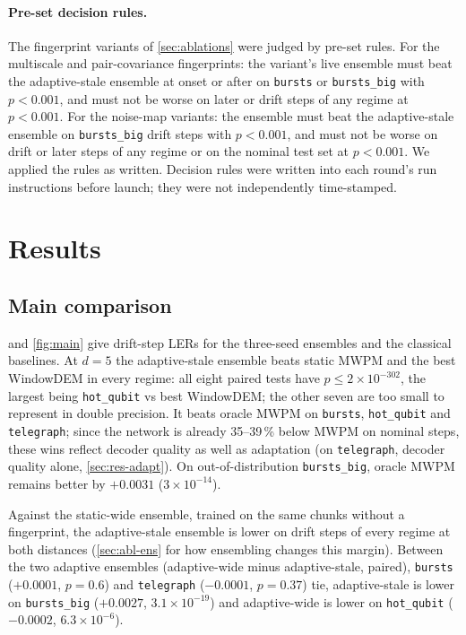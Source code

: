 \documentclass[11pt,a4paper]{article}
\newcommand{\reg}[1]{\texttt{#1}}
\newcommand{\E}[2]{${#1}{\times}10^{-#2}$}  %
\newcommand{\Eb}[2]{{#1}{\times}10^{-#2}}   %
\begin{document}
\paragraph{Pre-set decision rules.}
The fingerprint variants of \cref{sec:ablations} were judged by pre-set rules. For the multiscale
and pair-covariance fingerprints: the variant's live ensemble must beat the adaptive-stale ensemble at onset or
after on \reg{bursts} or \reg{bursts\_big} with $p<0.001$, and must not be worse on later or drift steps of any regime
at $p<0.001$. For the noise-map variants: the ensemble must beat the adaptive-stale ensemble on \reg{bursts\_big}
drift steps with $p<0.001$, and must not be worse on drift or later steps of any regime or on the nominal test set at
$p<0.001$. We applied the rules as written. Decision rules were written into each round's run instructions before
launch; they were not independently time-stamped.

\section{Results}\label{sec:results}

\subsection{Main comparison}\label{sec:res-main}
 and \cref{fig:main} give drift-step LERs for the three-seed ensembles and the classical baselines.
At $d=5$ the adaptive-stale ensemble beats static MWPM and the best WindowDEM in every regime: all eight
paired tests have $p\le\Eb{2}{302}$, the largest being \reg{hot\_qubit} vs best WindowDEM; the other seven are too
small to represent in double precision. It beats oracle MWPM on \reg{bursts},
\reg{hot\_qubit} and \reg{telegraph}; since the network is already 35--39\,\% below MWPM on nominal steps, these wins
reflect decoder quality as well as adaptation (on \reg{telegraph}, decoder quality alone, \cref{sec:res-adapt}). On
out-of-distribution \reg{bursts\_big}, oracle MWPM remains better by $+0.0031$ (\E{3}{14}).

Against the static-wide ensemble, trained on the same chunks without a fingerprint, the adaptive-stale ensemble is
lower on drift steps of every regime at both distances (\cref{sec:abl-ens} for how ensembling changes this margin).
Between the two adaptive ensembles (adaptive-wide minus adaptive-stale, paired), \reg{bursts} ($+0.0001$, $p=0.6$) and
\reg{telegraph} ($-0.0001$, $p=0.37$) tie, adaptive-stale is lower on \reg{bursts\_big} ($+0.0027$, \E{3.1}{19}) and
adaptive-wide is lower on \reg{hot\_qubit} ($-0.0002$, \E{6.3}{6}).
\end{document}
